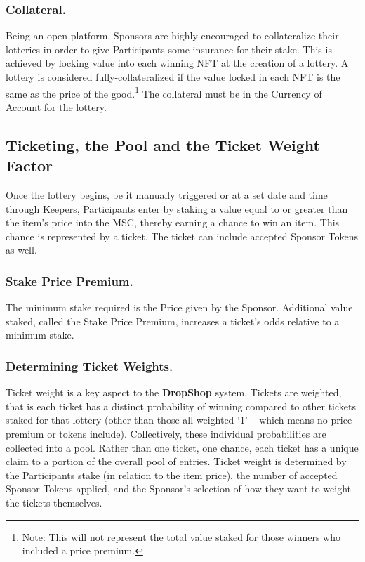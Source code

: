 \documentclass[runningheads]{llncs}
\begin{document}
\subsubsection{Collateral.}  Being an open platform, Sponsors are highly encouraged to collateralize their lotteries in order to give Participants some insurance for their stake.  This is achieved by locking value into each winning NFT at the creation of a lottery. A lottery is considered fully-collateralized if the value locked in each NFT is the same as the price of the good.\footnote{Note: This will not represent the total value staked for those winners who included a price premium.}   The collateral must be in the Currency of Account for the lottery.  

\subsection{Ticketing, the Pool and the Ticket Weight Factor}\label{subsection-Ticketing}
Once the lottery begins, be it manually triggered or at a set date and time through Keepers, Participants enter by staking a value equal to or greater than the item’s price into the MSC, thereby earning a chance to win an item.  This chance is represented by a ticket.  The ticket can include accepted Sponsor Tokens as well.  

\subsubsection{Stake Price Premium.}  The minimum stake required is the Price given by the Sponsor.  Additional value staked, called the Stake Price Premium, increases a ticket’s odds relative to a minimum stake.

\subsubsection{Determining Ticket Weights.} Ticket weight is a key aspect to the \textbf{DropShop} system.  Tickets are weighted, that is each ticket has a distinct probability of winning compared to other tickets staked for that lottery (other than those all weighted ‘1’ – which means no price premium or tokens include).  Collectively, these individual probabilities are collected into a pool.  Rather than one ticket, one chance, each ticket has a unique claim to a portion of the overall pool of entries. Ticket weight is determined by the Participants stake (in relation to the item price), the number of accepted Sponsor Tokens applied, and the Sponsor’s selection of how they want to weight the tickets themselves.
\end{document}
